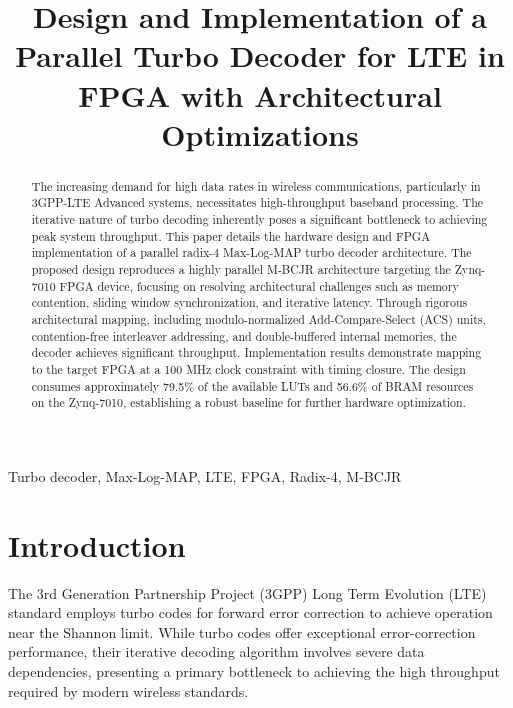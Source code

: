 \documentclass[conference]{IEEEtran}
\begin{document}
\title{Design and Implementation of a Parallel Turbo Decoder for LTE in FPGA with Architectural Optimizations}

\author{
}
\maketitle

\begin{abstract}
The increasing demand for high data rates in wireless communications, particularly in 3GPP-LTE Advanced systems, necessitates high-throughput baseband processing. The iterative nature of turbo decoding inherently poses a significant bottleneck to achieving peak system throughput. This paper details the hardware design and FPGA implementation of a parallel radix-4 Max-Log-MAP turbo decoder architecture. The proposed design reproduces a highly parallel M-BCJR architecture targeting the Zynq-7010 FPGA device, focusing on resolving architectural challenges such as memory contention, sliding window synchronization, and iterative latency. Through rigorous architectural mapping, including modulo-normalized Add-Compare-Select (ACS) units, contention-free interleaver addressing, and double-buffered internal memories, the decoder achieves significant throughput. Implementation results demonstrate mapping to the target FPGA at a 100 MHz clock constraint with timing closure. The design consumes approximately 79.5\% of the available LUTs and 56.6\% of BRAM resources on the Zynq-7010, establishing a robust baseline for further hardware optimization.
\end{abstract}

\begin{IEEEkeywords}
Turbo decoder, Max-Log-MAP, LTE, FPGA, Radix-4, M-BCJR
\end{IEEEkeywords}

\section{Introduction}
The 3rd Generation Partnership Project (3GPP) Long Term Evolution (LTE) standard employs turbo codes for forward error correction to achieve operation near the Shannon limit. While turbo codes offer exceptional error-correction performance, their iterative decoding algorithm involves severe data dependencies, presenting a primary bottleneck to achieving the high throughput required by modern wireless standards.
\end{document}
